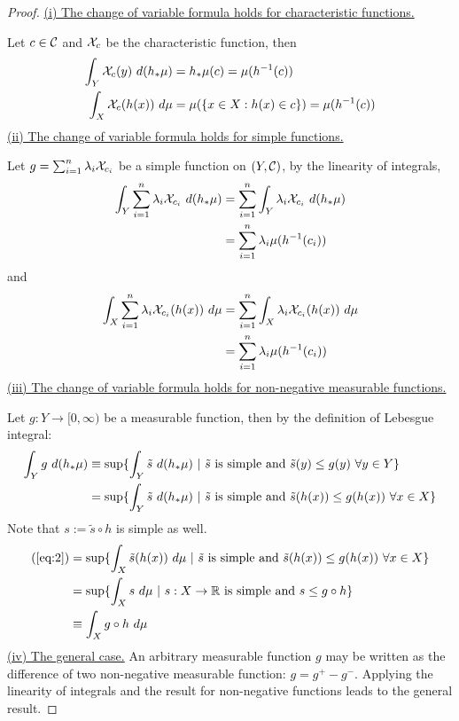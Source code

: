 \documentclass[11pt]{article}
\numberwithin{equation}{section}
\begin{document}
    \begin{proof}
        \ul{(i) The change of variable formula holds for characteristic functions.}
        
        Let $c \in \mathcal{{C}}$ and $\mathcal{{X}}_c$ be the characteristic function, then
        \begin{align}
            \int_Y \mathcal{{X}}_c(y)\ d(h_*\mu) &= h_*\mu(c) = \mu (h^{-1}(c)) \\
            \int_X \mathcal{{X}}_c(h(x))\ d\mu &= \mu(\{x \in X: h(x) \in c\}) = \mu(h^{-1}(c))
        \end{align}
        \ul{(ii) The change of variable formula holds for simple functions.}
        
        Let $g = \sum_{i=1}^n \lambda_i \mathcal{{X}}_{c_i}$ be a simple function on $(Y, \mathcal{{C}})$, by the linearity of integrals,
        \begin{align}
            \int_Y \sum_{i=1}^n \lambda_i \mathcal{{X}}_{c_i}\ d(h_*\mu) &= \sum_{i=1}^n \int_Y \lambda_i \mathcal{{X}}_{c_i}\ d(h_*\mu) \\
            &= \sum_{i=1}^n \lambda_i \mu(h^{-1}(c_i))
        \end{align}
        and
        \begin{align}
            \int_X \sum_{i=1}^n \lambda_i \mathcal{{X}}_{c_i}(h(x))\ d\mu &= \sum_{i=1}^n \int_X \lambda_i \mathcal{{X}}_{c_i}(h(x))\ d\mu \\
            &= \sum_{i=1}^n \lambda_i \mu(h^{-1}(c_i))
        \end{align}
        \ul{(iii) The change of variable formula holds for non-negative measurable functions.}
        
        Let $g: Y \to [0, \infty)$ be a measurable function, then by the definition of Lebesgue integral:
        \begin{align}
        	\int_Y g\ d(h_*\mu) &\equiv \sup \{
        		\int_Y \tilde{s}\ d(h_*\mu)\ |\ \tilde{s} \text{{ is simple and }} \tilde{s}(y) \leq g(y)\ \forall y \in Y
        	\} \\
        	&= \sup \{
        		\int_Y \tilde{s}\ d(h_*\mu)\ |\ \tilde{s} \text{{ is simple and }} \tilde{s}(h(x)) \leq g(h(x))\ \forall x \in X
        	\} \label{eq:2}
        \end{align}
        Note that $s := \tilde{s}\circ h$ is simple as well.
        \begin{align}
        	(\ref{eq:2}) &= \sup \{
        		\int_X \tilde{s}(h(x))\ d\mu\ |\ \tilde{s} \text{{ is simple and }} \tilde{s}(h(x)) \leq g(h(x))\ \forall x \in X
        	\} \\
        	&= \sup \{
        		\int_X s\ d\mu\ |\ s:X \to \mathbb{R} \text{{ is simple and }} s \leq g\circ h
        	\} \\
        	&\equiv \int_X g\circ h\ d\mu
        \end{align}
        \ul{(iv) The general case.} An arbitrary measurable function $g$ may be written as the difference of two non-negative measurable function: $g = g^+ - g^-$. Applying the linearity of integrals and the result for non-negative functions leads to the general result.
    \end{proof}
    
\end{document}
